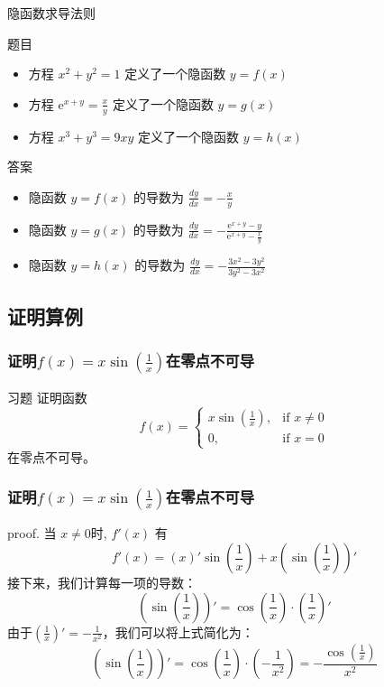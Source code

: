 \documentclass[
10pt,
aspectratio=43,
]{beamer}
\begin{document}
\begin{frame}{隐函数求导法则}
	\begin{block}{题目}
		\begin{itemize}
			\item 方程 $x^2 + y^2 = 1$ 定义了一个隐函数 $y = f(x)$
			\item 方程 $\displaystyle\mathrm{e}^{x+y}=\frac{x}{y}$ 定义了一个隐函数 $y = g(x)$
			\item 方程 $x^3 + y^3 = 9xy$ 定义了一个隐函数 $y = h(x)$
		\end{itemize}
	\end{block}

	\pause

	\begin{exampleblock}{答案}
		\begin{itemize}
			\item 隐函数 $y = f(x)$ 的导数为 $\displaystyle\frac{{dy}}{{dx}} = -\frac{{x}}{{y}}$
			\item 隐函数 $y = g(x)$ 的导数为 $\displaystyle\frac{{dy}}{{dx}} = -\frac{{\mathrm{e}^{x+y}-y}}{{\mathrm{e}^{x+y}-\frac{x}{y}}}$
			\item 隐函数 $y = h(x)$ 的导数为 $\displaystyle\frac{{dy}}{{dx}} = -\frac{{3x^2 - 3y^2}}{{3y^2 - 3x^2}}$
		\end{itemize}
	\end{exampleblock}
\end{frame}

\subsection{证明算例}

\begin{frame}
	\frametitle{证明$f(x)=x\sin\left(\frac{1}{x}\right)$在零点不可导}
	\begin{exampleblock}{习题}
		证明函数
		\[
			f(x) = \begin{cases}
				x\sin\left(\frac{1}{x}\right), & \text{if } x \neq 0 \\
				0,                             & \text{if } x = 0
			\end{cases}
		\]
		在零点不可导。
	\end{exampleblock}
\end{frame}

\begin{frame}
	\frametitle{证明$f(x)=x\sin\left(\frac{1}{x}\right)$在零点不可导}

	\begin{block}{proof.}
		当 $x\neq0$时, $f'(x)$ 有
		\[
			f'(x) = \left(x\right)' \sin\left(\frac{1}{x}\right) + x \left(\sin\left(\frac{1}{x}\right)\right)'
		\]
		接下来，我们计算每一项的导数：
		\[
			\left(\sin\left(\frac{1}{x}\right)\right)' = \cos\left(\frac{1}{x}\right) \cdot \left(\frac{1}{x}\right)'
		\]
		由于$\left(\frac{1}{x}\right)' = -\frac{1}{x^2}$，我们可以将上式简化为：
		\[
			\left(\sin\left(\frac{1}{x}\right)\right)' = \cos\left(\frac{1}{x}\right) \cdot \left(-\frac{1}{x^2}\right) = -\frac{\cos\left(\frac{1}{x}\right)}{x^2}
		\]
	\end{block}
\end{frame}
\end{document}

